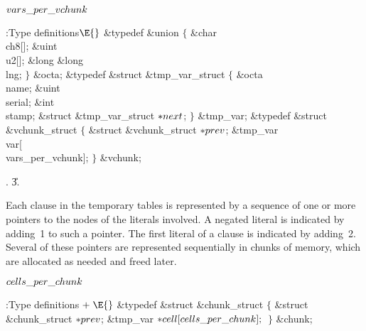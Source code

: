 \Y\B\4\D$\\{vars\_per\_vchunk}$ \5
\par
\Y\B\4:Type definitions\X${}\E{}$\6
\&{typedef} \&{union} ${}\{{}$\1\6
\&{char} \\{ch8}[];\6
\&{uint} \\{u2}[];\6
\&{long} \&{long} \\{lng};\2\6
${}\}{}$ \&{octa};\6
\&{typedef} \&{struct} \&{tmp\_var\_struct} ${}\{{}$\1\6
\&{octa} \\{name};\6
\&{uint} \\{serial};\6
\&{int} \\{stamp};\6
\&{struct} \&{tmp\_var\_struct} ${}{*}\\{next}{}$;\2%
\6
${}\}{}$ \&{tmp\_var};\7
\&{typedef} \&{struct} \&{vchunk\_struct} ${}\{{}$\1\6
\&{struct} \&{vchunk\_struct} ${}{*}\\{prev}{}$;\6
\&{tmp\_var} \\{var}[\\{vars\_per\_vchunk}];\2\6
${}\}{}$ \&{vchunk};\par
{}.
\U3.\fi

Each clause in the temporary tables is represented by a
sequence of
one or more pointers to the  nodes of the literals involved.
A negated literal is indicated by adding~1 to such a pointer.
The first literal of a clause is indicated by adding~2.
Several of these pointers are represented sequentially in chunks
of memory, which are allocated as needed and freed later.

\Y\B\4\D$\\{cells\_per\_chunk}$ \5
\par
\Y\B\4:Type definitions\X${}\mathrel+\E{}$\6
\&{typedef} \&{struct} \&{chunk\_struct} ${}\{{}$\1\6
\&{struct} \&{chunk\_struct} ${}{*}\\{prev}{}$;\6
\&{tmp\_var} ${}{*}\\{cell}[\\{cells\_per\_chunk}];{}$\2\6
${}\}{}$ \&{chunk};\par
\fi

